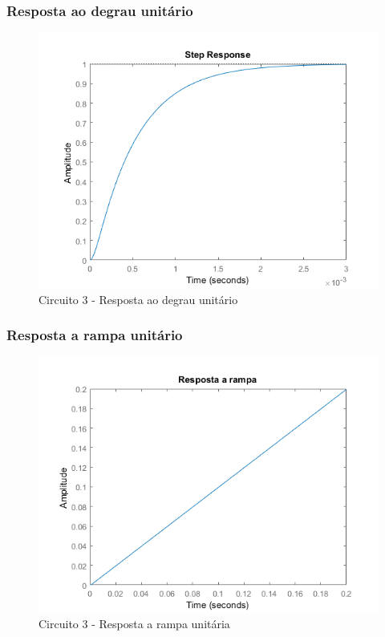 \documentclass[a4paper, 12pt]{article}
\begin{document}
			\subsubsection{Resposta ao degrau unitário}
			\begin{figure}[!ht]
				\centering
				\includegraphics[scale=0.68]{img/1g_circ3.png}
				\caption{Circuito 3 - Resposta ao degrau unitário}
			\end{figure}
			\subsubsection{Resposta a rampa unitário}
			\begin{figure}[!ht]
				\centering
				\includegraphics[scale=0.68]{img/1h_circ3.png}
				\caption{Circuito 3 - Resposta a rampa unitária}
			\end{figure}
\end{document}
